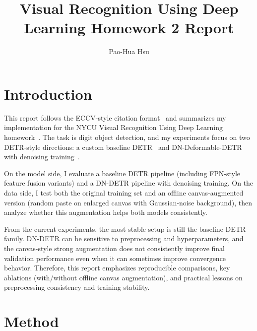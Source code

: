 \documentclass[runningheads]{llncs}
\begin{document}
\title{Visual Recognition Using Deep Learning Homework 2 Report}

\author{Pao-Hua Hsu}


\maketitle

\section{Introduction}
\label{sec:intro}
This report follows the ECCV-style citation format~\cite{eccv_guideline} and summarizes my implementation for the NYCU Visual Recognition Using Deep Learning homework~\cite{lin2026course}. The task is digit object detection, and my experiments focus on two DETR-style directions: a custom baseline DETR~\cite{carion2020detr} and DN-Deformable-DETR with denoising training~\cite{li2022dndetr}.

On the model side, I evaluate a baseline DETR pipeline (including FPN-style feature fusion variants) and a DN-DETR pipeline with denoising training. On the data side, I test both the original training set and an offline canvas-augmented version (random paste on enlarged canvas with Gaussian-noise background), then analyze whether this augmentation helps both models consistently.

From the current experiments, the most stable setup is still the baseline DETR family. DN-DETR can be sensitive to preprocessing and hyperparameters, and the canvas-style strong augmentation does not consistently improve final validation performance even when it can sometimes improve convergence behavior. Therefore, this report emphasizes reproducible comparisons, key ablations (with/without offline canvas augmentation), and practical lessons on preprocessing consistency and training stability.

\section{Method}
\label{sec:method}
\end{document}
